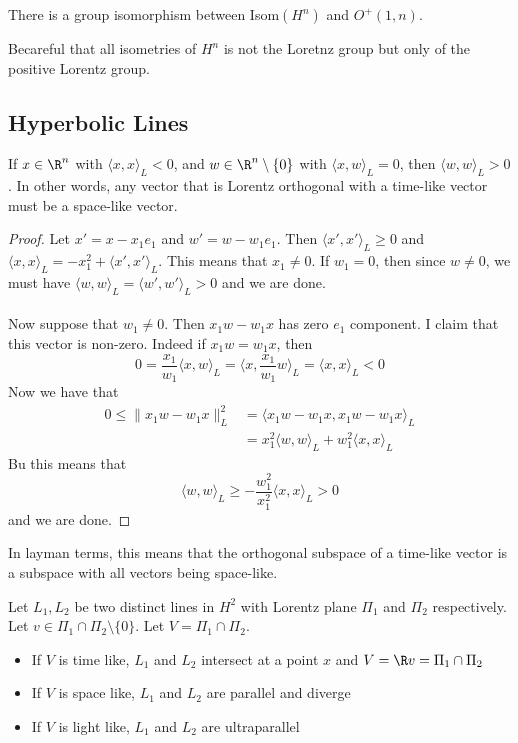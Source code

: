 \begin{crl}{}{} There is a group isomorphism between Isom$(H^n)$ and $O^+(1,n)$. 
\end{crl}

Becareful that all isometries of $H^n$ is not the Loretnz group but only of the positive Lorentz group. 

\subsection{Hyperbolic Lines}
\begin{lmm}{}{} If $x\in\R^n$ with $\langle x,x\rangle_L<0$, and $w\in\R^n\setminus\{0\}$ with $\langle x,w\rangle_L=0$, then $\langle w,w\rangle_L>0$. In other words, any vector that is Lorentz orthogonal with a time-like vector must be a space-like vector. \tcbline
\begin{proof}
Let $x'=x-x_1e_1$ and $w'=w-w_1e_1$. Then $\langle x',x'\rangle_L\geq 0$ and $\langle x,x\rangle_L=-x_1^2+\langle x',x'\rangle_L$. This means that $x_1\neq 0$. If $w_1=0$, then since $w\neq 0$, we must have $\langle w,w\rangle_L=\langle w',w'\rangle_L>0$ and we are done. \\~\\
Now suppose that $w_1\neq 0$. Then $x_1w-w_1x$ has zero $e_1$ component. I claim that this vector is non-zero. Indeed if $x_1w=w_1x$, then $$0=\frac{x_1}{w_1}\langle x,w\rangle_L=\langle x,\frac{x_1}{w_1}w\rangle_L=\langle x,x\rangle_L<0$$ Now we have that 
\begin{align*}
0\leq\|x_1w-w_1x\|_L^2&=\langle x_1w-w_1x,x_1w-w_1x\rangle_L\\
&=x_1^2\langle w,w\rangle_L+w_1^2\langle x,x\rangle_L
\end{align*}
Bu this means that $$\langle w,w\rangle_L\geq-\frac{w_1^2}{x_1^2}\langle x,x\rangle_L>0$$ and we are done. 
\end{proof}
\end{lmm}

In layman terms, this means that the orthogonal subspace of a time-like vector is a subspace with all vectors being space-like. 

\begin{defn}{}{} Let $L_1,L_2$ be two distinct lines in $H^2$ with Lorentz plane $\Pi_1$ and $\Pi_2$ respectively. Let $v\in\Pi_1\cap\Pi_2\setminus\{0\}$. Let $V=\Pi_1\cap\Pi_2$. 
\begin{itemize}
\item If $V$ is time like, $L_1$ and $L_2$ intersect at a point $x$ and $V=\R v=\Pi_1\cap\Pi_2$
\item If $V$ is space like, $L_1$ and $L_2$ are parallel and diverge
\item If $V$ is light like, $L_1$ and $L_2$ are ultraparallel
\end{itemize}
\end{defn}

